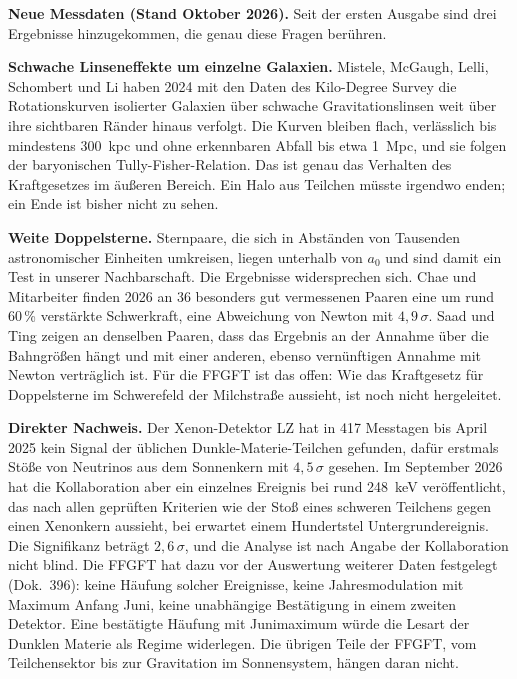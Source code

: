 \documentclass[11pt,oneside]{book}
\begin{document}
\medskip
\textbf{Neue Messdaten (Stand Oktober 2026).} Seit der ersten
Ausgabe sind drei Ergebnisse hinzugekommen, die genau diese
Fragen berühren.

\textbf{Schwache Linseneffekte um einzelne Galaxien.} Mistele,
McGaugh, Lelli, Schombert und Li haben 2024 mit den Daten des
Kilo-Degree Survey die Rotationskurven isolierter Galaxien über
schwache Gravitationslinsen weit über ihre sichtbaren Ränder
hinaus verfolgt. Die Kurven bleiben flach, verlässlich bis
mindestens 300~kpc und ohne erkennbaren Abfall bis etwa 1~Mpc,
und sie folgen der baryonischen Tully-Fisher-Relation. Das ist
genau das Verhalten des Kraftgesetzes im äußeren Bereich. Ein
Halo aus Teilchen müsste irgendwo enden; ein Ende ist bisher
nicht zu sehen.

\textbf{Weite Doppelsterne.} Sternpaare, die sich in Abständen von
Tausenden astronomischer Einheiten umkreisen, liegen unterhalb
von $a_0$ und sind damit ein Test in unserer Nachbarschaft. Die
Ergebnisse widersprechen sich. Chae und Mitarbeiter finden 2026
an 36 besonders gut vermessenen Paaren eine um rund 60\,\%
verstärkte Schwerkraft, eine Abweichung von Newton mit
$4{,}9\,\sigma$. Saad und Ting zeigen an denselben Paaren, dass
das Ergebnis an der Annahme über die Bahngrößen hängt und mit
einer anderen, ebenso vernünftigen Annahme mit Newton verträglich
ist. Für die FFGFT ist das offen: Wie das Kraftgesetz für
Doppelsterne im Schwerefeld der Milchstraße aussieht, ist noch
nicht hergeleitet.

\textbf{Direkter Nachweis.} Der Xenon-Detektor LZ hat in 417
Messtagen bis April 2025 kein Signal der üblichen
Dunkle-Materie-Teilchen gefunden, dafür erstmals Stöße von
Neutrinos aus dem Sonnenkern mit $4{,}5\,\sigma$ gesehen. Im
September 2026 hat die Kollaboration aber ein einzelnes Ereignis
bei rund 248~keV veröffentlicht, das nach allen geprüften
Kriterien wie der Stoß eines schweren Teilchens gegen einen
Xenonkern aussieht, bei erwartet einem Hundertstel
Untergrundereignis. Die Signifikanz beträgt $2{,}6\,\sigma$, und
die Analyse ist nach Angabe der Kollaboration nicht blind. Die
FFGFT hat dazu vor der Auswertung weiterer Daten festgelegt
(Dok.~396): keine Häufung solcher Ereignisse, keine
Jahresmodulation mit Maximum Anfang Juni, keine unabhängige
Bestätigung in einem zweiten Detektor. Eine bestätigte Häufung
mit Junimaximum würde die Lesart der Dunklen Materie als Regime
widerlegen. Die übrigen Teile der FFGFT, vom Teilchensektor bis
zur Gravitation im Sonnensystem, hängen daran nicht.

\end{document}
